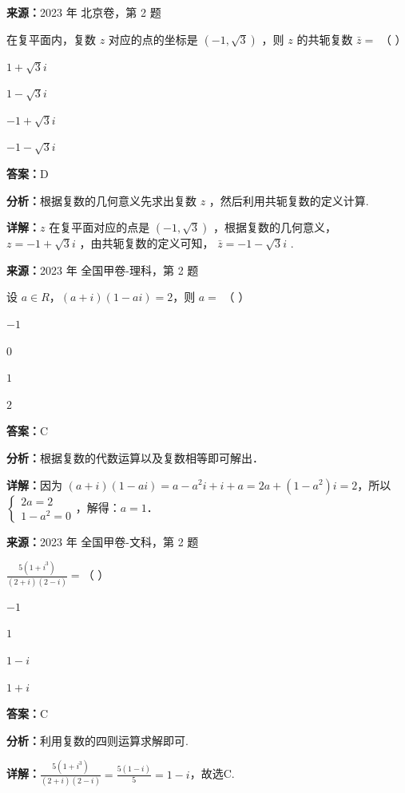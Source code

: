 \begin{question}[points=4]
\textbf{来源：}2023 年 北京卷，第 2 题\par
在复平面内，复数 $z$ 对应的点的坐标是 $(-1, \sqrt{3})$ ，则 $z$ 的共轭复数 $\bar{z} =$ （ ）
\begin{choices}
  \item $1 + \sqrt{3}i$
  \item $1 - \sqrt{3}i$
  \item $-1 + \sqrt{3}i$
  \item $-1 - \sqrt{3}i$
\end{choices}
\begin{solution}
\textbf{答案：}D

\textbf{分析：}根据复数的几何意义先求出复数 $z$ ，然后利用共轭复数的定义计算.

\textbf{详解：}$z$ 在复平面对应的点是 $(-1, \sqrt{3})$ ，根据复数的几何意义， $z = -1 + \sqrt{3}i$ ，由共轭复数的定义可知， $\bar{z} = -1 - \sqrt{3}i$ .
\end{solution}
\end{question}

\begin{question}[points=5]
\textbf{来源：}2023 年 全国甲卷-理科，第 2 题\par
设 $a \in R$，$(a + i)(1 - ai) = 2$，则 $a = $ （       ）
\begin{choices}
  \item $-1$
  \item $0$
  \item $1$
  \item $2$
\end{choices}
\begin{solution}
\textbf{答案：}C

\textbf{分析：}根据复数的代数运算以及复数相等即可解出．

\textbf{详解：}因为 $(a + i)(1 - ai) = a - a^2 i + i + a = 2a + (1 - a^2)i = 2$，所以 $\begin{cases} 2a = 2 \\ 1 - a^2 = 0 \end{cases}$，解得：$a = 1$．
\end{solution}
\end{question}

\begin{question}[points=5]
\textbf{来源：}2023 年 全国甲卷-文科，第 2 题\par
$\frac{5(1+i^3)}{(2+i)(2-i)} =$（    ）
\begin{choices}
  \item $-1$
  \item $1$
  \item $1-i$
  \item $1+i$
\end{choices}
\begin{solution}
\textbf{答案：}C

\textbf{分析：}利用复数的四则运算求解即可.

\textbf{详解：}$\frac{5(1+i^3)}{(2+i)(2-i)} = \frac{5(1-i)}{5} = 1-i$，故选C.
\end{solution}
\end{question}

